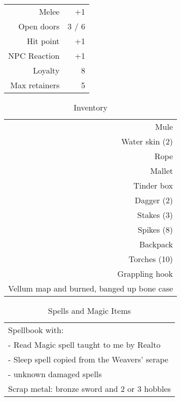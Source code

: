 \documentclass[a4paper]{article}
\begin{document}
\begin{multicols}{2}
\begin{table}[H]
\begin{center}
    \begin{tabular}{r|r} %
      Melee & +1\\
      Open doors & 3 / 6\\
      Hit point & +1\\
      NPC Reaction & +1\\
      Loyalty & 8\\
      Max retainers & 5\\
    \end{tabular}
  \end{center}
\end{table}
\begin{table}[H]
  \begin{center}
    \caption*{Inventory}
    \begin{tabular}{r} %
      Mule\\
      Water skin (2)\\
      Rope\\
      Mallet\\
      Tinder box\\
      Dagger (2)\\
      Stakes (3)\\
      Spikes (8)\\
      Backpack\\
      Torches (10)\\
      Grappling hook\\
      Vellum map and burned, banged up bone case\\
    \end{tabular}
  \end{center}
\end{table}
\begin{table}[H]
  \begin{center}
    \caption*{Spells and Magic Items}
    \begin{tabular}{l} %
      Spellbook with:\\
        - Read Magic spell taught to me by Realto\\
        - Sleep spell copied from the Weavers' serape\\
        - unknown damaged spells\\
      Scrap metal: bronze sword and 2 or 3 hobbles\\

\end{tabular}
\end{center}
\end{table}
\end{multicols}
\end{document}
